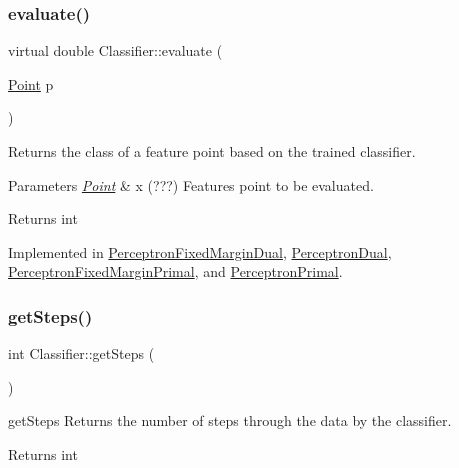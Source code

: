 \subsubsection{\texorpdfstring{evaluate()}{evaluate()}}
{\footnotesize\ttfamily virtual double Classifier\+::evaluate (\begin{DoxyParamCaption}\item[{\hyperlink{class_point}{Point}}]{p }\end{DoxyParamCaption})\hspace{0.3cm}{\ttfamily [pure virtual]}}



Returns the class of a feature point based on the trained classifier. 


\begin{DoxyParams}{Parameters}
{\em \hyperlink{class_point}{Point}} & x (???) Features point to be evaluated. \\
\hline
\end{DoxyParams}
\begin{DoxyReturn}{Returns}
int 
\end{DoxyReturn}


Implemented in \hyperlink{class_perceptron_fixed_margin_dual_a1370fdbc95bf728f82a83f219be32d23}{Perceptron\+Fixed\+Margin\+Dual}, \hyperlink{class_perceptron_dual_a3ed5554b85b4b1ec98f57acab3eeeaca}{Perceptron\+Dual}, \hyperlink{class_perceptron_fixed_margin_primal_af72c3dde96f1f1b803c7b522b5c1cc0f}{Perceptron\+Fixed\+Margin\+Primal}, and \hyperlink{class_perceptron_primal_ac8ce9ceffe2b35b5386e5367fb419b3b}{Perceptron\+Primal}.

\mbox{\label{class_classifier_a1fb3e4dfd80c154e89603c8fa1b11b76}} 
\subsubsection{\texorpdfstring{get\+Steps()}{getSteps()}}
{\footnotesize\ttfamily int Classifier\+::get\+Steps (\begin{DoxyParamCaption}{ }\end{DoxyParamCaption})}



get\+Steps Returns the number of steps through the data by the classifier. 

\begin{DoxyReturn}{Returns}
int 
\end{DoxyReturn}
\mbox{\label{class_classifier_a738c2fbed982db6cad02062edcc037e4}} 
